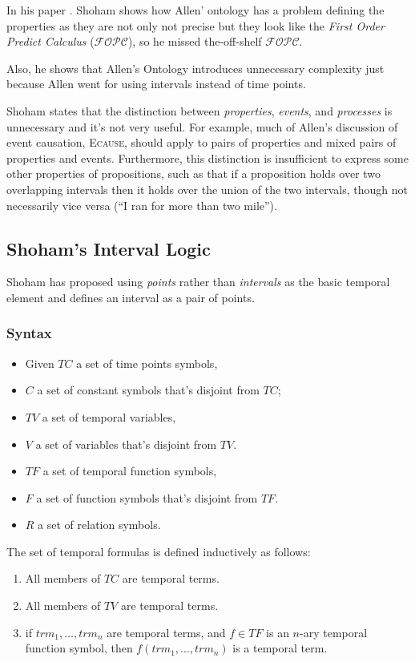 In his paper \cite{shoham1988temporal}.
Shoham shows how Allen' ontology has a problem defining the properties as they are not only not precise but they look like the \textit{First Order Predict Calculus} 
($\mathcal{FOPC}$), so he missed the-off-shelf $\mathcal{FOPC}$.

Also, he shows that Allen's Ontology introduces unnecessary complexity just because Allen went for using intervals instead of time points.

Shoham states that the distinction between \textit{properties}, \textit{events}, and \textit{processes} is unnecessary and it's not very useful.
For example, much of Allen's discussion of event causation, \textsc{Ecause}, should apply to pairs of properties and mixed pairs of properties and events. Furthermore, this distinction is insufficient to express some other properties of propositions, such as that if a proposition holds over two overlapping intervals then it holds over
the union of the two intervals, though not necessarily vice versa (``I ran for more than two mile'').


\subsection{Shoham's Interval Logic}
Shoham has proposed using \textit{points} rather than \textit{intervals} as the basic temporal element and defines an interval as a pair of points.
\subsubsection{Syntax}
\begin{itemize}
	\item Given $TC$ a set of time points symbols,
	\item $C$ a set of constant symbols that's disjoint from $TC$;
	\item $TV$ a set of temporal variables,
	\item $V$ a set of variables that's disjoint from $TV$.
	\item $TF$ a set of temporal function symbols,
	\item $F$ a set of function symbols that's disjoint from $TF$.
	\item $R$ a set of relation symbols.
\end{itemize}

The set of temporal formulas is defined inductively as follows:
\begin{enumerate}
	\item All members of $TC$ are temporal terms.
	\item All members of $TV$ are temporal terms.
	\item if $trm_1, \dots, trm_n$ are temporal terms, and $f \in TF$ is an $n$-ary temporal function symbol, then $f(trm_1, \dots, trm_n)$ is a temporal term.
\end{enumerate}

